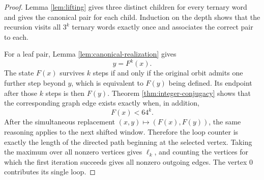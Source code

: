 \documentclass[11pt]{article}
\theoremstyle{definition}
\theoremstyle{remark}
\begin{document}
\begin{proof}
Lemma \ref{lem:lifting} gives three distinct children for every ternary word and gives the canonical pair for each child. Induction on the depth shows that the recursion visits all $3^k$ ternary words exactly once and associates the correct pair to each.

For a leaf pair, Lemma \ref{lem:canonical-realization} gives
\[
y=F^k(x).
\]
The state $F(x)$ survives $k$ steps if and only if the original orbit admits one further step beyond $y$, which is equivalent to $F(y)$ being defined. Its endpoint after those $k$ steps is then $F(y)$. Theorem \ref{thm:integer-conjugacy} shows that the corresponding graph edge exists exactly when, in addition,
\[
F(x)<64^k.
\]
After the simultaneous replacement $(x,y)\mapsto(F(x),F(y))$, the same reasoning applies to the next shifted window. Therefore the loop counter is exactly the length of the directed path beginning at the selected vertex. Taking the maximum over all nonzero vertices gives $\ell_k$, and counting the vertices for which the first iteration succeeds gives all nonzero outgoing edges. The vertex $0$ contributes its single loop.
\end{proof}
\end{document}
